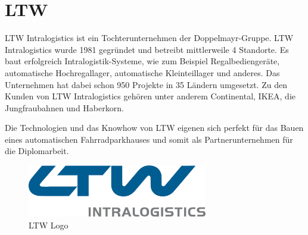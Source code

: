 \section{LTW}
LTW Intralogistics ist ein Tochterunternehmen der Doppelmayr-Gruppe. LTW Intralogistics wurde 1981 gegründet und betreibt mittlerweile 4 Standorte. Es baut erfolgreich Intralogistik-Systeme, wie zum Beispiel Regalbediengeräte, automatische Hochregallager, automatische Kleinteillager und anderes. Das Unternehmen hat dabei schon 950 Projekte in 35 Ländern umgesetzt. Zu den Kunden von LTW Intralogistics gehören unter anderem Continental, IKEA, die Jungfraubahnen und Haberkorn. 

\bigskip

\noindent Die Technologien und das Knowhow von LTW eigenen sich perfekt für das Bauen eines automatischen Fahrradparkhauses und somit als Partnerunternehmen für die Diplomarbeit.

\bigskip

\begin{figure}[H]
    \centering
    \includegraphics[width=0.7\textwidth]{images/ltwlogo.png}
    \caption{LTW Logo }
    \label{fig:ltwlogo}
\end{figure}